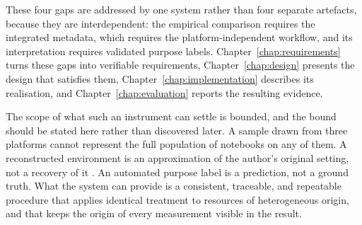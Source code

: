 These four gaps are addressed by one system rather than four separate artefacts, because they are interdependent: the empirical comparison requires the integrated metadata, which requires the platform-independent workflow, and its interpretation requires validated purpose labels. Chapter~\ref{chap:requirements} turns these gaps into verifiable requirements, Chapter~\ref{chap:design} presents the design that satisfies them, Chapter~\ref{chap:implementation} describes its realisation, and Chapter~\ref{chap:evaluation} reports the resulting evidence.

The scope of what such an instrument can settle is bounded, and the bound should be stated here rather than discovered later. A sample drawn from three platforms cannot represent the full population of notebooks on any of them. A reconstructed environment is an approximation of the author's original setting, not a recovery of it \cite{wang2020restoring}. An automated purpose label is a prediction, not a ground truth. What the system can provide is a consistent, traceable, and repeatable procedure that applies identical treatment to resources of heterogeneous origin, and that keeps the origin of every measurement visible in the result.
